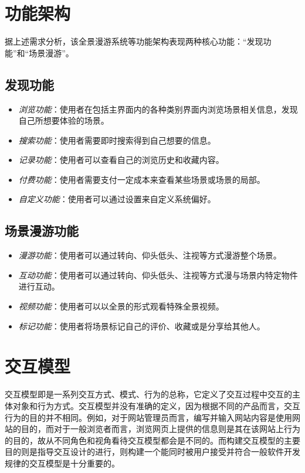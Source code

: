 \section{功能架构}
据上述需求分析，该全景漫游系统等功能架构表现两种核心功能：“发现功能”和“场景漫游”。

\subsection{发现功能}
\begin{itemize}
	\item \emph{浏览功能}：使用者在包括主界面内的各种类别界面内浏览场景相关信息，发现自己所想要体验的场景。
	\item \emph{搜索功能}：使用者需要即时搜索得到自己想要的信息。
	\item \emph{记录功能}：使用者可以查看自己的浏览历史和收藏内容。
	\item \emph{付费功能}：使用者需要支付一定成本来查看某些场景或场景的局部。
	\item \emph{自定义功能}：使用者可以通过设置来自定义系统偏好。
\end{itemize}

\subsection{场景漫游功能}

\begin{itemize}
	\item \emph{漫游功能}：使用者可以通过转向、仰头低头、注视等方式漫游整个场景。
	\item \emph{互动功能}：使用者可以通过转向、仰头低头、注视等方式漫与场景内特定物件进行互动。
	\item \emph{视频功能}：使用者可以以全景的形式观看特殊全景视频。
	\item \emph{标记功能}：使用者将场景标记自己的评价、收藏或是分享给其他人。
\end{itemize}

\section{交互模型}
交互模型即是一系列交互方式、模式、行为的总称，它定义了交互过程中交互的主体对象和行为方式。交互模型并没有准确的定义，因为根据不同的产品而言，交互行为的目的并不相同。例如，对于网站管理员而言，编写并输入网站内容是使用网站的目的，而对于一般浏览者而言，浏览网页上提供的信息则是其在该网站上行为的目的，故从不同角色和视角看待交互模型都会是不同的。而构建交互模型的主要目的则是指导交互设计的进行，则构建一个能同时被用户接受并符合一般软件开发规律的交互模型是十分重要的。

